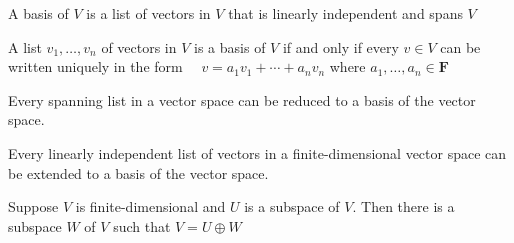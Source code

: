 
A basis of $V$ is a list of vectors in $V$ that is linearly independent and spans $V$

A list $v_{1}, \ldots, v_{n}$ of vectors in $V$ is a basis of $V$ if and only if every $v \in V$ can be written uniquely in the form
$
\quad v=a_{1} v_{1}+\cdots+a_{n} v_{n}
$
where $a_{1}, \ldots, a_{n} \in \mathbf{F}$

Every spanning list in a vector space can be reduced to a basis of the vector space.

Every linearly independent list of vectors in a finite-dimensional vector space can be extended to a basis of the vector space.

Suppose $V$ is finite-dimensional and $U$ is a subspace of $V .$ Then there is a subspace $W$ of $V$ such that $V=U \oplus W$
